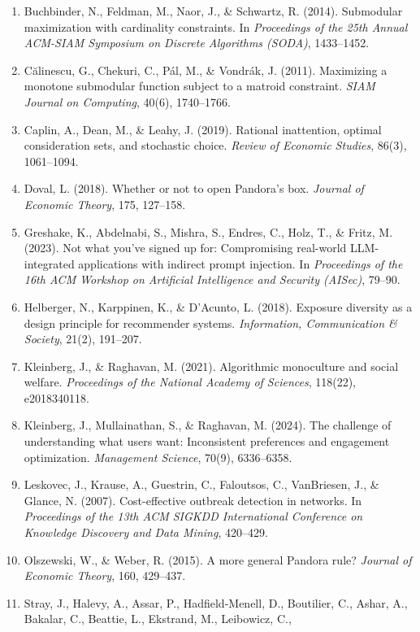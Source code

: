 \documentclass[
  11pt]{article}
\begin{document}
\begin{enumerate}
  249--265.
\item
  Buchbinder, N., Feldman, M., Naor, J., \& Schwartz, R. (2014).
  Submodular maximization with cardinality constraints. In
  \emph{Proceedings of the 25th Annual ACM-SIAM Symposium on Discrete
  Algorithms (SODA)}, 1433--1452.
\item
  Călinescu, G., Chekuri, C., Pál, M., \& Vondrák, J. (2011). Maximizing
  a monotone submodular function subject to a matroid constraint.
  \emph{SIAM Journal on Computing}, 40(6), 1740--1766.
\item
  Caplin, A., Dean, M., \& Leahy, J. (2019). Rational inattention,
  optimal consideration sets, and stochastic choice. \emph{Review of
  Economic Studies}, 86(3), 1061--1094.
\item
  Doval, L. (2018). Whether or not to open Pandora's box. \emph{Journal
  of Economic Theory}, 175, 127--158.
\item
  Greshake, K., Abdelnabi, S., Mishra, S., Endres, C., Holz, T., \&
  Fritz, M. (2023). Not what you've signed up for: Compromising
  real-world LLM-integrated applications with indirect prompt injection.
  In \emph{Proceedings of the 16th ACM Workshop on Artificial
  Intelligence and Security (AISec)}, 79--90.
\item
  Helberger, N., Karppinen, K., \& D'Acunto, L. (2018). Exposure
  diversity as a design principle for recommender systems.
  \emph{Information, Communication \& Society}, 21(2), 191--207.
\item
  Kleinberg, J., \& Raghavan, M. (2021). Algorithmic monoculture and
  social welfare. \emph{Proceedings of the National Academy of
  Sciences}, 118(22), e2018340118.
\item
  Kleinberg, J., Mullainathan, S., \& Raghavan, M. (2024). The challenge
  of understanding what users want: Inconsistent preferences and
  engagement optimization. \emph{Management Science}, 70(9), 6336--6358.
\item
  Leskovec, J., Krause, A., Guestrin, C., Faloutsos, C., VanBriesen, J.,
  \& Glance, N. (2007). Cost-effective outbreak detection in networks.
  In \emph{Proceedings of the 13th ACM SIGKDD International Conference
  on Knowledge Discovery and Data Mining}, 420--429.
\item
  Olszewski, W., \& Weber, R. (2015). A more general Pandora rule?
  \emph{Journal of Economic Theory}, 160, 429--437.
\item
  Stray, J., Halevy, A., Assar, P., Hadfield-Menell, D., Boutilier, C.,
  Ashar, A., Bakalar, C., Beattie, L., Ekstrand, M., Leibowicz, C.,

\end{enumerate}
\end{document}
